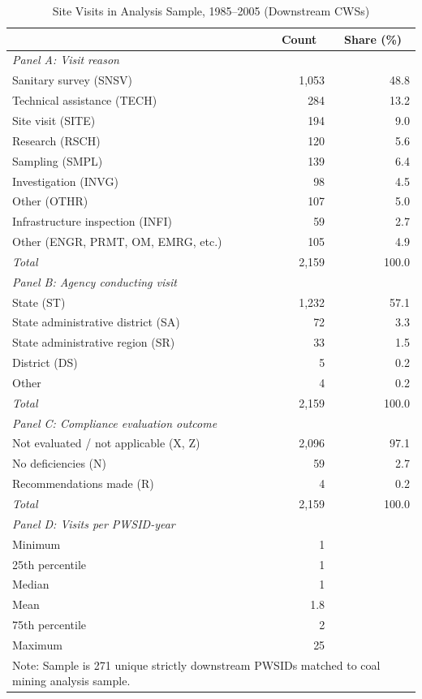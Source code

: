 \begin{table}[h!]
\centering
\caption{Site Visits in Analysis Sample, 1985--2005 (Downstream CWSs)}
\label{tab:site_visits_profile}
\small
\begin{tabular}{lrr}
\hline\hline
 & \multicolumn{1}{c}{Count} & \multicolumn{1}{c}{Share (\%)} \\
\hline
\multicolumn{3}{l}{\textit{Panel A: Visit reason}} \\
Sanitary survey (SNSV) & 1,053 & 48.8 \\
Technical assistance (TECH) & 284 & 13.2 \\
Site visit (SITE) & 194 & 9.0 \\
Research (RSCH) & 120 & 5.6 \\
Sampling (SMPL) & 139 & 6.4 \\
Investigation (INVG) & 98 & 4.5 \\
Other (OTHR) & 107 & 5.0 \\
Infrastructure inspection (INFI) & 59 & 2.7 \\
Other (ENGR, PRMT, OM, EMRG, etc.) & 105 & 4.9 \\
\hline
\textit{Total} & 2,159 & 100.0 \\[6pt]
\multicolumn{3}{l}{\textit{Panel B: Agency conducting visit}} \\
State (ST) & 1,232 & 57.1 \\
State administrative district (SA) & 72 & 3.3 \\
State administrative region (SR) & 33 & 1.5 \\
District (DS) & 5 & 0.2 \\
Other & 4 & 0.2 \\
\hline
\textit{Total} & 2,159 & 100.0 \\[6pt]
\multicolumn{3}{l}{\textit{Panel C: Compliance evaluation outcome}} \\
Not evaluated / not applicable (X, Z) & 2,096 & 97.1 \\
No deficiencies (N) & 59 & 2.7 \\
Recommendations made (R) & 4 & 0.2 \\
\hline
\textit{Total} & 2,159 & 100.0 \\[6pt]
\multicolumn{3}{l}{\textit{Panel D: Visits per PWSID-year}} \\
Minimum & 1 & \\
25th percentile & 1 & \\
Median & 1 & \\
Mean & 1.8 & \\
75th percentile & 2 & \\
Maximum & 25 & \\
\hline\hline
\multicolumn{3}{l}{\footnotesize Note: Sample is 271 unique strictly downstream PWSIDs matched to coal mining analysis sample.} \\
\end{tabular}
\end{table}

